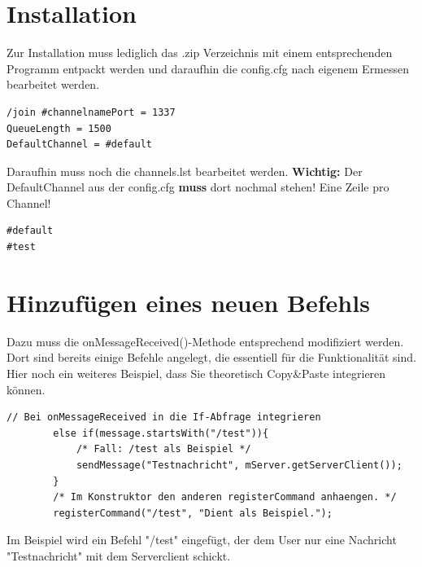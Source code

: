 \documentclass[a4paper,12pt]{scrartcl}
\begin{document}
\begin{itemize}
\section{Installation}
Zur Installation muss lediglich das .zip Verzeichnis mit einem entsprechenden Programm entpackt werden und daraufhin die config.cfg nach eigenem Ermessen bearbeitet werden.
\begin{lstlisting}[frame=single,caption=Beispielinhalt der Konfigurationsdatei]
/join #channelnamePort = 1337
QueueLength = 1500
DefaultChannel = #default
\end{lstlisting}
Daraufhin muss noch die channels.lst bearbeitet werden. \textbf{Wichtig:} Der DefaultChannel aus der config.cfg \textbf{muss} dort nochmal stehen! Eine Zeile pro Channel!
\begin{lstlisting}[frame=single,caption=Beispielinhalt der Channeldatei]
#default
#test
\end{lstlisting}

\section{Hinzufügen eines neuen Befehls}
Dazu muss die onMessageReceived()-Methode entsprechend modifiziert werden. Dort sind bereits einige Befehle angelegt, die essentiell für die Funktionalität sind.\\

Hier noch ein weiteres Beispiel, dass Sie theoretisch Copy\&Paste integrieren können.
\begin{lstlisting}[frame=single,caption=Beispielinhalt der Channeldatei]
		// Bei onMessageReceived in die If-Abfrage integrieren
 		else if(message.startsWith("/test")){
			/* Fall: /test als Beispiel */
			sendMessage("Testnachricht", mServer.getServerClient());			
		}
		/* Im Konstruktor den anderen registerCommand anhaengen. */
		registerCommand("/test", "Dient als Beispiel."); 
\end{lstlisting}
Im Beispiel wird ein Befehl "/test" {eingefügt}, der dem User nur eine Nachricht "Testnachricht" mit dem Serverclient schickt.

\end{itemize}
\end{document}
